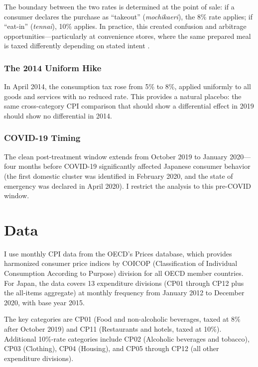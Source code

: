 \documentclass[12pt]{article}
\begin{document}
The boundary between the two rates is determined at the point of sale: if a consumer declares the purchase as ``takeout'' (\textit{mochikaeri}), the 8\% rate applies; if ``eat-in'' (\textit{tennai}), 10\% applies. In practice, this created confusion and arbitrage opportunities---particularly at convenience stores, where the same prepared meal is taxed differently depending on stated intent \citep{nikkei2019confusion}.

\subsubsection*{The 2014 Uniform Hike} In April 2014, the consumption tax rose from 5\% to 8\%, applied uniformly to all goods and services with no reduced rate. This provides a natural placebo: the same cross-category CPI comparison that should show a differential effect in 2019 should show no differential in 2014.

\subsubsection*{COVID-19 Timing} The clean post-treatment window extends from October 2019 to January 2020---four months before COVID-19 significantly affected Japanese consumer behavior (the first domestic cluster was identified in February 2020, and the state of emergency was declared in April 2020). I restrict the analysis to this pre-COVID window.

\section{Data}

I use monthly CPI data from the OECD's Prices database, which provides harmonized consumer price indices by COICOP (Classification of Individual Consumption According to Purpose) division for all OECD member countries. For Japan, the data covers 13 expenditure divisions (CP01 through CP12 plus the all-items aggregate) at monthly frequency from January 2012 to December 2020, with base year 2015.

The key categories are CP01 (Food and non-alcoholic beverages, taxed at 8\% after October 2019) and CP11 (Restaurants and hotels, taxed at 10\%). Additional 10\%-rate categories include CP02 (Alcoholic beverages and tobacco), CP03 (Clothing), CP04 (Housing), and CP05 through CP12 (all other expenditure divisions).


\end{document}
